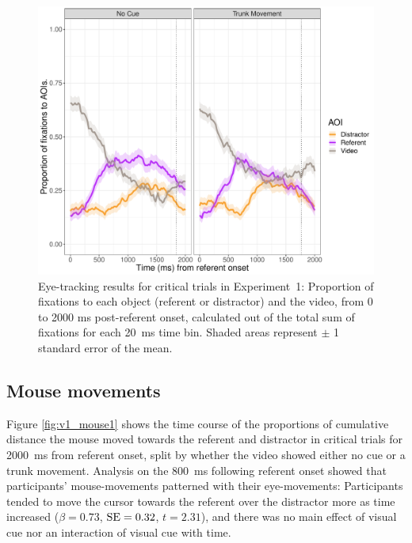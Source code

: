\documentclass[a4paper,man,natbib]{apa6}
\newcommand{\resultsLM}[3]{$\beta = #1$, $\textnormal{SE} = #2$, $t #3$}
\begin{document}
\begin{figure}[Ht]
  \centering
	\includegraphics[width=\linewidth]{./img/e7_fixations_crit.pdf}
  \caption{Eye-tracking results for critical trials in Experiment~1: Proportion of fixations to each object (referent or distractor) and the video, from 0 to 2000 ms post-referent onset, calculated out of the total sum of fixations for each 20~ms time bin. Shaded areas represent $\pm$ 1 standard error of the mean.}
  \label{fig:v1_eye1}
\end{figure}

\subsection{Mouse movements}
Figure \ref{fig:v1_mouse1} shows the time course of the proportions of cumulative distance the mouse moved towards the referent and distractor in critical trials for 2000~ms from referent onset, split by whether the video showed either no cue or a trunk movement.
Analysis on the 800~ms following referent onset showed that participants' mouse-movements patterned with their eye-movements:
Participants tended to move the cursor towards the referent over the distractor more as time increased (\resultsLM{0.73}{0.32}{=2.31}), and there was no main effect of visual cue nor an interaction of visual cue with time.
\end{document}
